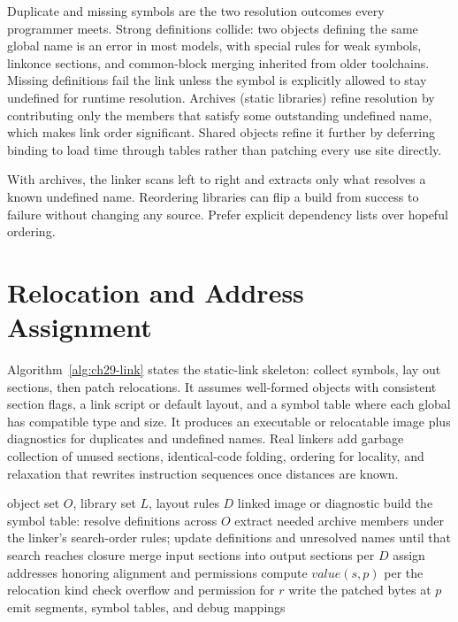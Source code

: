 Duplicate and missing symbols are the two resolution outcomes every programmer meets.
Strong definitions collide: two objects defining the same global name is an error in most models, with special rules for weak symbols, linkonce sections, and common-block merging inherited from older toolchains.
Missing definitions fail the link unless the symbol is explicitly allowed to stay undefined for runtime resolution.
Archives (static libraries) refine resolution by contributing only the members that satisfy some outstanding undefined name, which makes link order significant.
Shared objects refine it further by deferring binding to load time through tables rather than patching every use site directly.
\begin{ccnote}
With archives, the linker scans left to right and extracts only what resolves a known undefined name.
Reordering libraries can flip a build from success to failure without changing any source.
Prefer explicit dependency lists over hopeful ordering.
\end{ccnote}

\section{Relocation and Address Assignment}\label{sec:ch29-algorithm}

Algorithm~\ref{alg:ch29-link} states the static-link skeleton: collect symbols, lay out sections, then patch relocations.
It assumes well-formed objects with consistent section flags, a link script or default layout, and a symbol table where each global has compatible type and size.
It produces an executable or relocatable image plus diagnostics for duplicates and undefined names.
Real linkers add garbage collection of unused sections, identical-code folding, ordering for locality, and relaxation that rewrites instruction sequences once distances are known.

\begin{algorithm}[htbp]
\caption{Static link: resolve, lay out, and relocate}\label{alg:ch29-link}
\begin{pseudocode}
\Require object set $O$, library set $L$, layout rules $D$
\Ensure linked image or diagnostic
\State build the symbol table: resolve definitions across $O$
\State extract needed archive members under the linker's search-order rules; update definitions and unresolved names until that search reaches closure
\State merge input sections into output sections per $D$
\State assign addresses honoring alignment and permissions
\State compute $value(s, p)$ per the relocation kind
\State check overflow and permission for $r$
\State write the patched bytes at $p$
\EndFor
\State emit segments, symbol tables, and debug mappings
\end{pseudocode}
\end{algorithm}

